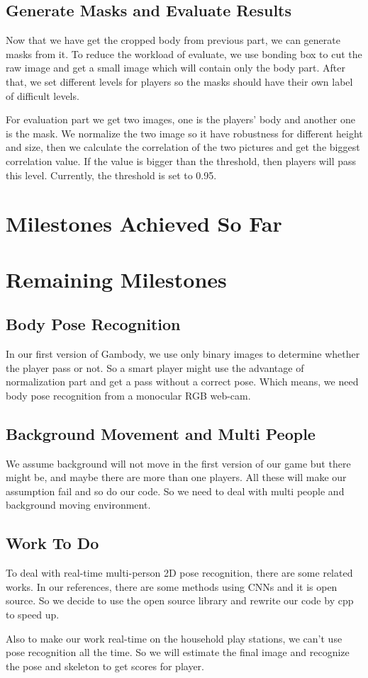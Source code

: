 \documentclass[conference,compsoc]{IEEEtran}
\begin{document}
\subsection{Generate Masks and Evaluate Results}
	Now that we have get the cropped body from previous part, we can generate masks from it. 
	To reduce the workload of evaluate, we use bonding box to cut the raw image and get a small image which will contain only the body part.
	After that, we set different levels for players so the masks should have their own label of difficult levels.
\par
	For evaluation part we get two images, one is the players' body and another one is the mask. 
	We normalize the two image so it have robustness for different height and size, then we calculate the correlation of the two pictures and get the biggest correlation value. 
	If the value is bigger than the threshold, then players will pass this level.
	Currently, the threshold is set to 0.95.
\par
\section{Milestones Achieved So Far}
\section{Remaining Milestones}
\subsection{Body Pose Recognition}
In our first version of Gambody, we use only binary images to determine whether the player pass or not. So a smart player might use the advantage of normalization part and get a pass without a correct pose. Which means, we need body pose recognition from a monocular RGB web-cam.\par
\subsection{Background Movement and Multi People}
We assume background will not move in the first version of our game but there might be, and maybe there  are more than one players. All these will make our assumption fail and so do our code. So we need to deal with multi people and background moving environment.\par
\subsection{Work To Do}
To deal with real-time multi-person 2D pose recognition, there are some related works. In our references, there are some methods using CNNs and it is open source. So we decide to use the open source library and rewrite our code by cpp to speed up.\par
Also to make our work real-time on the household play stations, we can't use pose recognition all the time. So we will estimate the final image and recognize the pose and skeleton to get scores for player.


% 
% 
\end{document}

